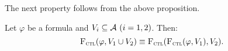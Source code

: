 \documentclass{article}
\begin{document}


The next property follows from the above proposition.

\begin{corollary}[Commutativity]\label{disTFV}
Let $\varphi$ be a formula and $V_i\subseteq{\cal A}~(i=1,2)$. Then:
\[
{\textsc{F}_{\textsc{ctl}}}(\varphi, V_1 \cup V_2) \equiv {\textsc{F}_{\textsc{ctl}}}({\textsc{F}_{\textsc{ctl}}}(\varphi, V_1), V_2).
\]
\end{corollary}
\end{document}
